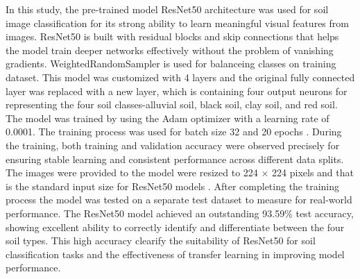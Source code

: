 \documentclass[conference]{IEEEtran}
\begin{document}
In this study, the pre-trained model ResNet50 architecture was used for soil image classification for its strong ability to learn meaningful visual features from images. ResNet50 is built with residual blocks and skip connections that helps the model train deeper networks effectively without the problem of vanishing gradients. WeightedRandomSampler is used for balanceing classes on training dataset. This model was customized with 4 layers and the original fully connected layer was replaced with a new layer, which is containing four output neurons for representing the four soil classes-alluvial soil, black soil, clay soil, and red soil. The model was trained by using the Adam optimizer with a learning rate of 0.0001. The training process was used for batch size 32 and 20 epochs \cite{b10}. During the training, both training and validation accuracy were observed precisely for ensuring stable learning and consistent performance across different data splits. The images were provided to the model were resized to 224 × 224 pixels and that is the standard input size for ResNet50 models \cite{b10}\cite{b13}\cite{b7}. After completing the training process the model was tested on a separate test dataset to measure for real-world performance. The ResNet50 model achieved an outstanding 93.59\% test accuracy, showing excellent ability to correctly identify and differentiate between the four soil types. This high accuracy clearify the suitability of ResNet50 for soil classification tasks and the effectiveness of transfer learning in improving model performance.
\end{document}
